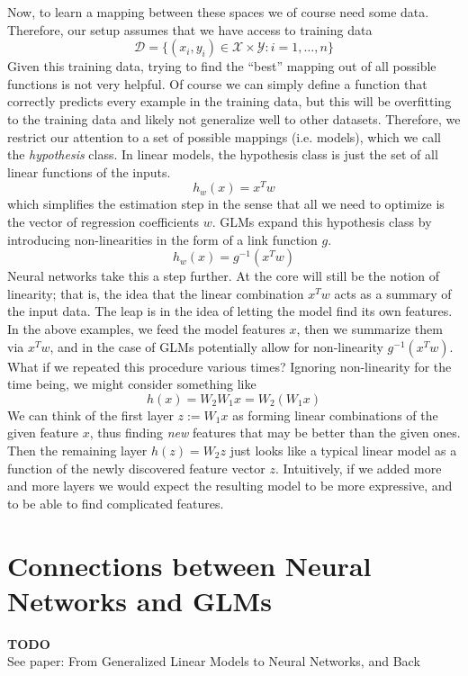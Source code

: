 \documentclass[12pt]{article}
\begin{document}
Now, to learn a mapping between these spaces we of course need some data. Therefore, our setup assumes that we have access to training data
\[\mathcal{D} = \{(x_i, y_i) \in \mathcal{X} \times \mathcal{Y}: i = 1, \dots, n\}\]
Given this training data, trying to find the ``best'' mapping out of all possible functions is not very helpful. Of course we can simply define a function that correctly predicts every example
in the training data, but this will be overfitting to the training data and likely not generalize well to other datasets. Therefore, we restrict our attention to a set of possible mappings (i.e. models), 
which we call the \textit{hypothesis} class. In linear models, the hypothesis class is just the set of all linear functions of the inputs.
\[h_w(x) = x^T w\]
which simplifies the estimation step in the sense that all we need to optimize is the vector of regression coefficients $w$.
GLMs expand this hypothesis class by introducing non-linearities in the form of a link function $g$. 
\[h_w(x) = g^{-1}(x^T w)\]
Neural networks take this a step further. At the core will still be the notion of linearity; that is, the idea that the linear combination $x^T w$ acts as a summary of the input data. The leap is in the 
idea of letting the model find its own features. In the above examples, we feed the model features $x$, then we summarize them via $x^T w$, and in the case of GLMs potentially allow for 
non-linearity $g^{-1}(x^T w)$. What if we repeated this procedure various times? Ignoring non-linearity for the time being, we might consider something like
\[h(x) = W_2 W_1 x = W_2 (W_1 x)\]
We can think of the first layer $z := W_1 x$ as forming linear combinations of the given feature $x$, thus finding \textit{new} features that may be better than the given ones. Then the 
remaining layer $h(z) = W_2 z$ just looks like a typical linear model as a function of the newly discovered feature vector $z$. Intuitively, if we added more and more layers we would expect 
the resulting model to be more expressive, and to be able to find complicated features. 

\section{Connections between Neural Networks and GLMs}
\textbf{TODO}\\
See paper: From Generalized Linear Models to Neural Networks, and Back
\end{document}
